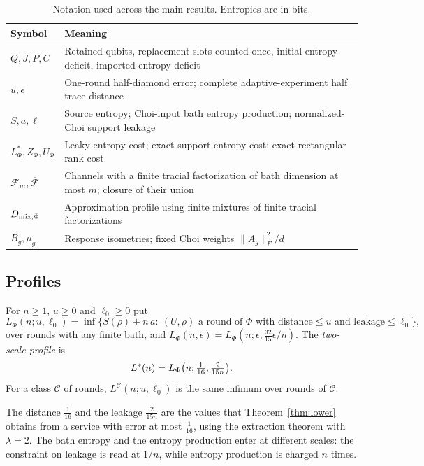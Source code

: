 \begin{table}[ht]
\centering\small
\begin{tabularx}{\textwidth}{@{}lX@{}}
\toprule
Symbol & Meaning\\
\midrule
$Q,J,P,C$ & Retained qubits, replacement slots counted once, initial entropy deficit, imported entropy deficit\\
$u,\epsilon$ & One-round half-diamond error; complete adaptive-experiment half trace distance\\
$S,a,\ell$ & Source entropy; Choi-input bath entropy production; normalized-Choi support leakage\\
$L^*_\Phi,Z_\Phi,U_\Phi$ & Leaky entropy cost; exact-support entropy cost; exact rectangular rank cost\\
$\mathcal F_m,\overline{\mathcal F}$ & Channels with a finite tracial factorization of bath dimension at most $m$; closure of their union\\
$D_{\rm mix,\Phi}$ & Approximation profile using finite mixtures of finite tracial factorizations\\
$B_g,\mu_g$ & Response isometries; fixed Choi weights $\|A_g\|_F^2/d$\\
\bottomrule
\end{tabularx}
\caption{Notation used across the main results. Entropies are in bits.}\label{tab:notation}
\end{table}

\subsection{Profiles}

\begin{definition}\label{def:profile}
For $n\ge1$, $u\ge0$ and $\ell_0\ge0$ put
\[
L_\Phi(n;u,\ell_0)=\inf\bigl\{S(\rho)+n\,a:\ (U,\rho)\text{ a round of }\Phi\text{ with distance}\le u\text{ and leakage}\le\ell_0\bigr\},
\]
over rounds with any finite bath, and $L_\Phi(n,\epsilon)=L_\Phi(n;\epsilon,\tfrac{32}{15}\epsilon/n)$. The \emph{two-scale profile} is
\[
L^{*}(n)=L_\Phi\bigl(n;\tfrac1{16},\tfrac2{15n}\bigr).
\]
For a class $\mathcal C$ of rounds, $L^{\mathcal C}(n;u,\ell_0)$ is the same infimum over rounds of $\mathcal C$.
\end{definition}

The distance $\frac1{16}$ and the leakage $\frac2{15n}$ are the values that Theorem~\ref{thm:lower} obtains from a service with error at most
$\frac1{16}$, using the extraction theorem with $\lambda=2$. The bath entropy and the entropy production enter at different scales: the constraint on leakage is read at
$1/n$, while entropy production is charged $n$ times.


